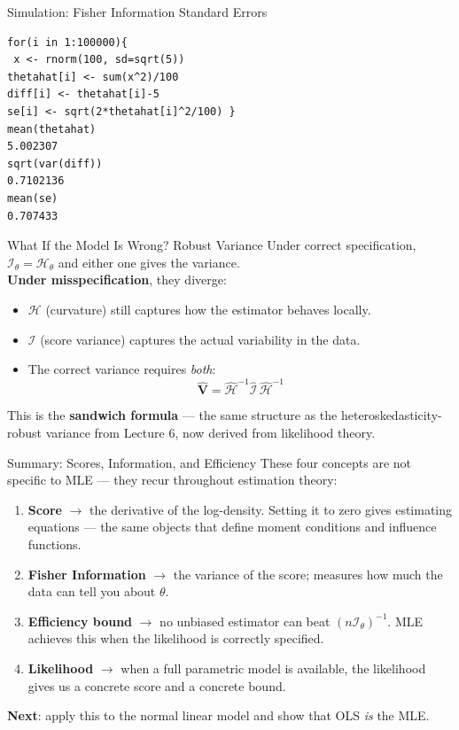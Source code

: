 \documentclass[aspectratio=169, handout, t]{beamer}
\numberwithin{equation}{section}
\begin{document}
\begin{frame}[fragile]{Simulation: Fisher Information Standard Errors}
\begin{lstlisting}[style=Rstyle]
for(i in 1:100000){
 x <- rnorm(100, sd=sqrt(5))
thetahat[i] <- sum(x^2)/100 
diff[i] <- thetahat[i]-5 
se[i] <- sqrt(2*thetahat[i]^2/100) }
mean(thetahat)
5.002307 
sqrt(var(diff))
0.7102136
mean(se)
0.707433
\end{lstlisting}
\end{frame}


\begin{frame}{What If the Model Is Wrong? Robust Variance}
Under correct specification, $\mathcal{I}_\theta=\mathcal{H}_\theta$ and either one gives the variance.\\
\textbf{Under misspecification}, they diverge:\pause
\begin{itemize}
\item $\mathcal{H}$ (curvature) still captures how the estimator behaves locally.
\item $\mathcal{I}$ (score variance) captures the actual variability in the data.\pause
\item The correct variance requires \emph{both}:
$$\bm{\hat{V}}=\hat{\mathcal{H}}^{-1}\hat{\mathcal{I}}\,\hat{\mathcal{H}}^{-1}$$\pause
\end{itemize}
\begin{tcolorbox}[colback=blue!5, colframe=blue!50]
This is the \textbf{sandwich formula} --- the same structure as the heteroskedasticity-robust variance from Lecture 6, now derived from likelihood theory.
\end{tcolorbox}
\end{frame}

\begin{frame}{Summary: Scores, Information, and Efficiency}
These four concepts are \alert{not specific to MLE} --- they recur throughout estimation theory:\pause
\begin{enumerate}\setlength{\itemsep}{4pt}
\item \textbf{Score} $\to$ the derivative of the log-density.  Setting it to zero gives estimating equations --- the same objects that define moment conditions and influence functions.\pause
\item \textbf{Fisher Information} $\to$ the variance of the score; measures how much the data can tell you about $\theta$.\pause
\item \textbf{Efficiency bound} $\to$ no unbiased estimator can beat $(n\mathcal{I}_\theta)^{-1}$.  MLE achieves this when the likelihood is correctly specified.\pause
\item \textbf{Likelihood} $\to$ when a full parametric model is available, the likelihood gives us a concrete score and a concrete bound.
\end{enumerate}\pause
\medskip
\textbf{Next}: apply this to the normal linear model and show that OLS \emph{is} the MLE.
\end{frame}
\end{document}
